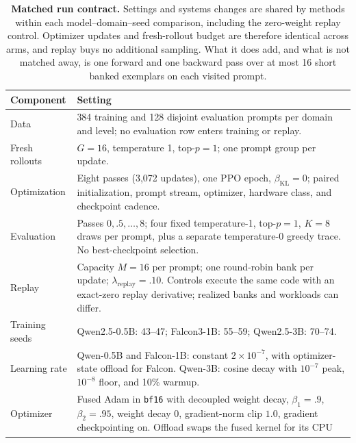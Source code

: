 \documentclass{article}
\newcommand{\1}{\mathbf 1}
\theoremstyle{remark}
\theoremstyle{definition}
\theoremstyle{plain}
\begin{document}
\begin{table}[!htbp]
  \centering
  \caption{\textbf{Matched run contract.} Settings and systems changes are
  shared by methods within each model--domain--seed comparison, including
  the zero-weight replay control. Optimizer updates and fresh-rollout budget
  are therefore identical across arms, and replay buys no additional sampling.
  What it does add, and what is not matched away, is one forward and one
  backward pass over at most 16 short banked exemplars on each visited prompt.}
  \label{tab:run-contract}
  \small
  \begin{tabularx}{\linewidth}{@{}P{.23\linewidth}Y@{}}
    \toprule
    \textbf{Component} & \textbf{Setting} \\
    \midrule
    Data & 384 training and 128 disjoint evaluation prompts per domain and
      level; no evaluation row enters training or replay. \\
    Fresh rollouts & $G=16$, temperature 1, top-$p=1$; one prompt group per update. \\
    Optimization & Eight passes (3,072 updates), one PPO epoch,
      $\beta_{\mathrm{KL}}=0$; paired initialization, prompt stream,
      optimizer, hardware class, and checkpoint cadence. \\
    Evaluation & Passes $0,.5,\ldots,8$; four fixed temperature-1,
      top-$p=1$, $K=8$ draws per prompt, plus a separate temperature-0
      greedy trace. No best-checkpoint selection. \\
    Replay & Capacity $M=16$ per prompt; one round-robin bank per update;
      $\lambda_{\mathrm{replay}}=.10$. Controls execute the same code with
      an exact-zero replay derivative; realized banks and workloads can differ. \\
    Training seeds & Qwen2.5-0.5B: 43--47; Falcon3-1B: 55--59;
      Qwen2.5-3B: 70--74. \\
    Learning rate & Qwen-0.5B and Falcon-1B: constant $2\times10^{-7}$,
      with optimizer-state offload for Falcon. Qwen-3B: cosine decay with
      $10^{-7}$ peak, $10^{-8}$ floor, and 10\% warmup. \\
    Optimizer & Fused Adam in \texttt{bf16} with decoupled weight decay,
      $\beta_1=.9$, $\beta_2=.95$, weight decay $0$, gradient-norm clip $1.0$,
      gradient checkpointing on. Offload swaps the fused kernel for its CPU

\end{tabularx}
\end{table}
\end{document}
